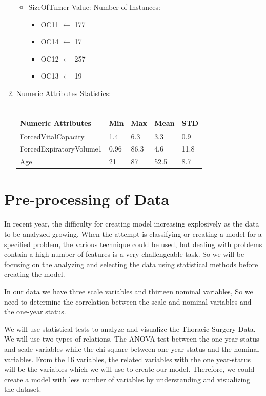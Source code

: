 \documentclass[a4paper, 11pt, oneside]{article} %
\begin{document}
\begin{enumerate}
\begin{itemize}
\item{SizeOfTumer Value: Number of Instances:}
\begin{itemize}
\item OC11 $\leftarrow$ 177
\item OC14 $\leftarrow$ 17
\item OC12 $\leftarrow$ 257
\item OC13 $\leftarrow$ 19
\end{itemize}
\end{itemize}
\item {Numeric Attributes Statistics:}\\\\
\begin{tabular}{ |p{4.5cm}||p{1cm}|p{1cm}|p{1cm}| p{1cm}| }
 \hline
 Numeric Attributes&Min& Max&Mean&STD\\
 \hline
ForcedVitalCapacity   & 1.4    &6.3&  3.3 &0.9 \\
ForcedExpiratoryVolume1 &  0.96  & 86.3   &4.6 &11.8\\
 Age &21 & 87&  52.5 & 8.7\\
 \hline
\end{tabular}

\end{enumerate}

\section {Pre-processing of Data}
In recent year, the difficulty for creating model increasing explosively as the data to be analyzed growing. When the attempt is classifying or creating a model for a specified problem, the various technique could be used, but dealing with problems contain a high number of features is a very challengeable task. So we will be focusing on the analyzing and selecting the data using statistical methods before creating the model.

In our data we have three scale variables and thirteen nominal variables, So we need to determine the correlation between the scale and nominal variables and the one-year status.\cite{researchgate} 

We will use statistical tests to analyze and visualize the Thoracic Surgery Data. We will use two types of relations. The ANOVA test \cite{analyticsvidhya1} between the one-year status and scale variables while the chi-square\cite{mathsisfun}  between one-year status and the nominal variables. From the 16 variables, the related variables with the one year-status will be the variables which we will use to create our model. Therefore, we could create a model with less number of variables by understanding and visualizing the dataset. 
\end{document}
